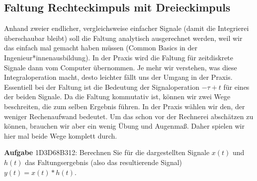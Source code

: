 \newpage
\subsection{Faltung Rechteckimpuls mit Dreieckimpuls}
\label{sec:1D3D68B312}
\begin{Ziel}
Anhand zweier endlicher, vergleichsweise einfacher Signale (damit die Integrierei
überschaubar bleibt) soll die Faltung analytisch ausgerechnet werden, weil
wir das einfach mal gemacht haben müssen (Common Basics in der
Ingenieur*innenausbildung).
%
In der Praxis wird die Faltung für zeitdiskrete Signale dann vom Computer
übernommen.
%
Je mehr wir verstehen, was diese Integraloperation macht, desto leichter fällt
uns der Umgang in der Praxis.
%
Essentiell bei der Faltung ist die Bedeutung der Signaloperation $-\tau+t$
für eines der beiden Signale.
%
Da die Faltung kommutativ ist, können wir zwei Wege beschreiten, die zum selben
Ergebnis führen. In der Praxis wählen wir den, der weniger Rechenaufwand bedeutet.
Um das schon vor der Rechnerei abschätzen zu können, brauchen wir aber ein wenig
Übung und Augenmaß. Daher spielen wir hier mal beide Wege komplett durch.
\end{Ziel}
%
\textbf{Aufgabe} {\tiny 1D3D68B312}: Berechnen Sie für die dargestellten Signale
$x(t)$ und $h(t)$ das Faltungsergebnis (also das resultierende Signal)
$y(t) = x(t) \ast h(t)$.
%
\begin{center}
\end{center}

